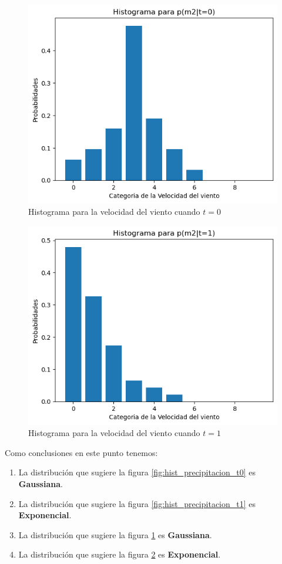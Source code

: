 \documentclass[spanish,english]{article}
\begin{document}
\begin{enumerate}
%
\begin{figure}[hbtp!]
    \centering
    \includegraphics[width=0.75\linewidth]{Quiz_2//Imagenes/histograma_viento_t0.png}
    \caption{Histograma para la velocidad del viento cuando $t = 0$}
    \label{fig:hist_viento_t0}
\end{figure}\newpage

%
\begin{figure}[hbtp!]
    \centering
    \includegraphics[width=0.75\linewidth]{Quiz_2//Imagenes/histograma_viento_t1.png}
    \caption{Histograma para la velocidad del viento cuando $t = 1$}
    \label{fig:hist_viento_t1}
\end{figure}

Como conclusiones en este punto tenemos:
\begin{enumerate}
    \item La distribuci\'{o}n que sugiere la figura \ref{fig:hist_precipitacion_t0} es \textbf{Gaussiana}.
    \item La distribuci\'{o}n que sugiere la figura \ref{fig:hist_precipitacion_t1} es \textbf{Exponencial}.
    \item La distribuci\'{o}n que sugiere la figura \ref{fig:hist_viento_t0} es \textbf{Gaussiana}.
    \item La distribuci\'{o}n que sugiere la figura \ref{fig:hist_viento_t1} es \textbf{Exponencial}.
\end{enumerate}


\end{enumerate}
\end{document}
